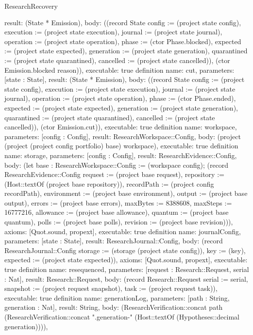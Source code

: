 \begin{lexlean}{ResearchRecovery}
\begin{semanticmodule}
{ result: (State * Emission),
 body: ((record State {config := (project state config), execution := (project state execution), journal := (project state journal), operation := (project state operation), phase := (ctor Phase.blocked), expected := (project state expected), generation := (project state generation), quarantined := (project state quarantined), cancelled := (project state cancelled)}), (ctor Emission.blocked reason)),
 executable: true
}
definition{
 name: cut,
 parameters: [state : State],
 result: (State * Emission),
 body: ((record State {config := (project state config), execution := (project state execution), journal := (project state journal), operation := (project state operation), phase := (ctor Phase.ended), expected := (project state expected), generation := (project state generation), quarantined := (project state quarantined), cancelled := (project state cancelled)}), (ctor Emission.cut)),
 executable: true
}
definition{
 name: workspace,
 parameters: [config : Config],
 result: ResearchWorkspace::Config,
 body: (project (project (project config portfolio) base) workspace),
 executable: true
}
definition{
 name: storage,
 parameters: [config : Config],
 result: ResearchEvidence::Config,
 body: (let base : ResearchWorkspace::Config := (workspace config); (record ResearchEvidence::Config {request := (project base request), repository := (Host::textOf (project base repository)), recordPath := (project config recordPath), environment := (project base environment), output := (project base output), errors := (project base errors), maxBytes := 8388608, maxSteps := 16777216, allowance := (project base allowance), quantum := (project base quantum), polls := (project base polls), revision := (project base revision)})),
 axioms: [Quot.sound, propext],
 executable: true
}
definition{
 name: journalConfig,
 parameters: [state : State],
 result: ResearchJournal::Config,
 body: (record ResearchJournal::Config {storage := (storage (project state config)), key := (key), expected := (project state expected)}),
 axioms: [Quot.sound, propext],
 executable: true
}
definition{
 name: resequenced,
 parameters: [request : Research::Request, serial : Nat],
 result: Research::Request,
 body: (record Research::Request {serial := serial, snapshot := (project request snapshot), task := (project request task)}),
 executable: true
}
definition{
 name: generationLog,
 parameters: [path : String, generation : Nat],
 result: String,
 body: (ResearchVerification::concat path (ResearchVerification::concat ".generation-" (Host::textOf (Hypotheses::decimal generation)))),
}
\end{semanticmodule}
\end{lexlean}
